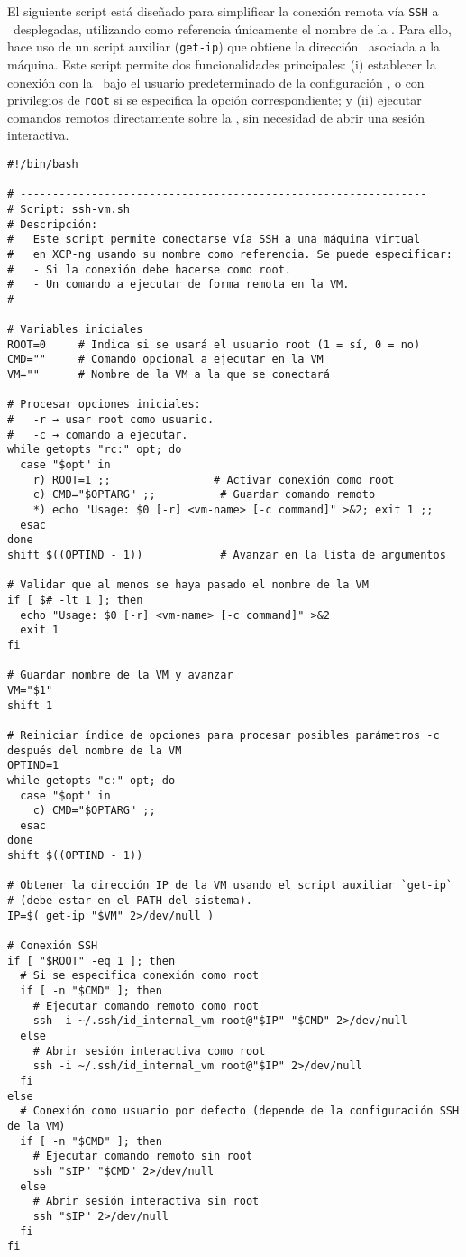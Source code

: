 El siguiente script está diseñado para simplificar la conexión remota vía \texttt{SSH} a \VM\ desplegadas, utilizando como referencia únicamente el nombre de la \VM. Para ello, hace uso de un script auxiliar (\texttt{get-ip}) que obtiene la dirección \IP\ asociada a la máquina. Este script permite dos funcionalidades principales: (i) establecer la conexión con la \VM\ bajo el usuario predeterminado de la configuración \SSH, o con privilegios de \texttt{root} si se especifica la opción correspondiente; y (ii) ejecutar comandos remotos directamente sobre la \VM, sin necesidad de abrir una sesión interactiva.

\begin{verbatim}
#!/bin/bash

# ---------------------------------------------------------------
# Script: ssh-vm.sh
# Descripción:
#   Este script permite conectarse vía SSH a una máquina virtual 
#   en XCP-ng usando su nombre como referencia. Se puede especificar:
#   - Si la conexión debe hacerse como root.
#   - Un comando a ejecutar de forma remota en la VM.
# ---------------------------------------------------------------

# Variables iniciales
ROOT=0     # Indica si se usará el usuario root (1 = sí, 0 = no)
CMD=""     # Comando opcional a ejecutar en la VM
VM=""      # Nombre de la VM a la que se conectará

# Procesar opciones iniciales:
#   -r → usar root como usuario.
#   -c → comando a ejecutar.
while getopts "rc:" opt; do
  case "$opt" in
    r) ROOT=1 ;;                # Activar conexión como root
    c) CMD="$OPTARG" ;;          # Guardar comando remoto
    *) echo "Usage: $0 [-r] <vm-name> [-c command]" >&2; exit 1 ;;
  esac
done
shift $((OPTIND - 1))            # Avanzar en la lista de argumentos

# Validar que al menos se haya pasado el nombre de la VM
if [ $# -lt 1 ]; then
  echo "Usage: $0 [-r] <vm-name> [-c command]" >&2
  exit 1
fi

# Guardar nombre de la VM y avanzar
VM="$1"
shift 1

# Reiniciar índice de opciones para procesar posibles parámetros -c después del nombre de la VM
OPTIND=1
while getopts "c:" opt; do
  case "$opt" in
    c) CMD="$OPTARG" ;;
  esac
done
shift $((OPTIND - 1))

# Obtener la dirección IP de la VM usando el script auxiliar `get-ip`
# (debe estar en el PATH del sistema).
IP=$( get-ip "$VM" 2>/dev/null )

# Conexión SSH
if [ "$ROOT" -eq 1 ]; then
  # Si se especifica conexión como root
  if [ -n "$CMD" ]; then
    # Ejecutar comando remoto como root
    ssh -i ~/.ssh/id_internal_vm root@"$IP" "$CMD" 2>/dev/null
  else
    # Abrir sesión interactiva como root
    ssh -i ~/.ssh/id_internal_vm root@"$IP" 2>/dev/null
  fi
else
  # Conexión como usuario por defecto (depende de la configuración SSH de la VM)
  if [ -n "$CMD" ]; then
    # Ejecutar comando remoto sin root
    ssh "$IP" "$CMD" 2>/dev/null
  else
    # Abrir sesión interactiva sin root
    ssh "$IP" 2>/dev/null
  fi
fi
\end{verbatim}
